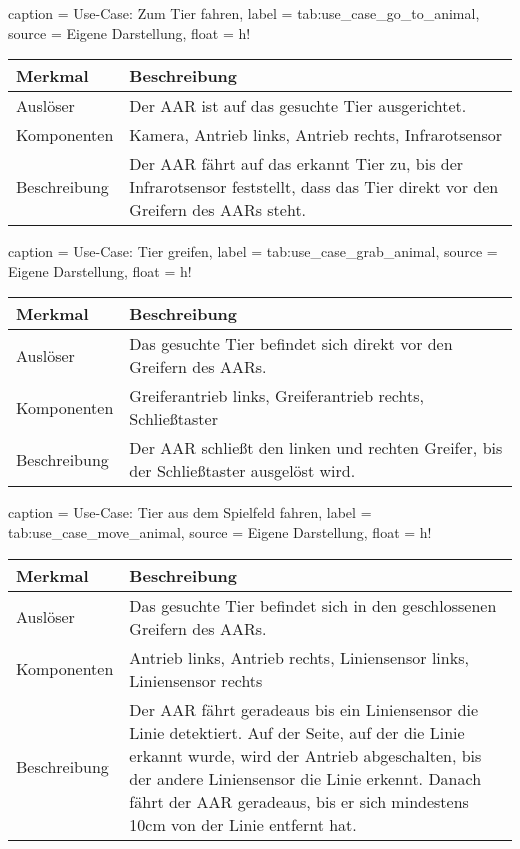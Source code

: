 \begin{dhbwtable}{%
    caption	= Use-Case: Zum Tier fahren,
    label	= tab:use_case_go_to_animal,
    source	= Eigene Darstellung,
    float = h!
}
    \begin{tabularx}{\textwidth}{lX}
        \toprule
        \textbf{Merkmal}     & \textbf{Beschreibung}  \\\midrule
        Auslöser     & Der \ac{AAR} ist auf das gesuchte Tier ausgerichtet.\\
        Komponenten  & Kamera, Antrieb links, Antrieb rechts, Infrarotsensor\\
        Beschreibung & Der \ac{AAR} fährt auf das erkannt Tier zu, bis der Infrarotsensor feststellt, dass das Tier direkt vor den Greifern des \acp{AAR} steht.\\\bottomrule
    \end{tabularx}    
\end{dhbwtable}

\begin{dhbwtable}{%
    caption	= Use-Case: Tier greifen,
    label	= tab:use_case_grab_animal,
    source	= Eigene Darstellung,
    float = h!
}
    \begin{tabularx}{\textwidth}{lX}
        \toprule
        \textbf{Merkmal}     & \textbf{Beschreibung}  \\\midrule
        Auslöser     & Das gesuchte Tier befindet sich direkt vor den Greifern des \acp{AAR}. \\
        Komponenten  & Greiferantrieb links, Greiferantrieb rechts, Schließtaster \\
        Beschreibung & Der \ac{AAR} schließt den linken und rechten Greifer, bis der Schließtaster ausgelöst wird.\\\bottomrule
    \end{tabularx}    
\end{dhbwtable}

\begin{dhbwtable}{%
    caption	= Use-Case: Tier aus dem Spielfeld fahren,
    label	= tab:use_case_move_animal,
    source	= Eigene Darstellung,
    float = h!
}
    \begin{tabularx}{\textwidth}{lX}
        \toprule
        \textbf{Merkmal}     & \textbf{Beschreibung}  \\\midrule
        Auslöser     & Das gesuchte Tier befindet sich in den geschlossenen Greifern des \acp{AAR}.\\
        Komponenten  & Antrieb links, Antrieb rechts, Liniensensor links, Liniensensor rechts\\
        Beschreibung & Der \ac{AAR} fährt geradeaus bis ein Liniensensor die Linie detektiert. Auf der Seite, auf der die Linie erkannt wurde, wird der Antrieb abgeschalten, bis der andere Liniensensor die Linie erkennt. Danach fährt der \ac{AAR} geradeaus, bis er sich mindestens 10cm von der Linie entfernt hat.\\\bottomrule
    \end{tabularx}    
\end{dhbwtable}

